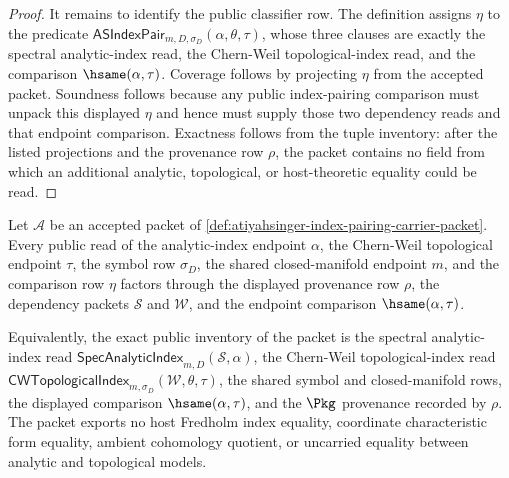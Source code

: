 \begin{proof}
It remains to identify the public classifier row. The definition assigns $\eta$ to the predicate $\mathsf{ASIndexPair}_{m,D,\sigma_D}(\alpha,\theta,\tau)$, whose three clauses are exactly the spectral analytic-index read, the Chern-Weil topological-index read, and the comparison $\hsame(\alpha,\tau)$. Coverage follows by projecting $\eta$ from the accepted packet. Soundness follows because any public index-pairing comparison must unpack this displayed $\eta$ and hence must supply those two dependency reads and that endpoint comparison. Exactness follows from the tuple inventory: after the listed projections and the provenance row $\rho$, the packet contains no field from which an additional analytic, topological, or host-theoretic equality could be read.
\end{proof}

\begin{theorem}
\label{thm:atiyahsinger-index-pairing-provenance-exactness}
Let $\mathcal{A}$ be an accepted packet of
\autoref{def:atiyahsinger-index-pairing-carrier-packet}. Every public read of
the analytic-index endpoint $\alpha$, the Chern-Weil topological endpoint
$\tau$, the symbol row $\sigma_D$, the shared closed-manifold endpoint $m$, and
the comparison row $\eta$ factors through the displayed provenance row $\rho$,
the dependency packets $\mathcal{S}$ and $\mathcal{W}$, and the endpoint
comparison $\hsame(\alpha,\tau)$.

Equivalently, the exact public inventory of the packet is the spectral
analytic-index read
$\mathsf{SpecAnalyticIndex}_{m,D}(\mathcal{S},\alpha)$, the Chern-Weil
topological-index read
$\mathsf{CWTopologicalIndex}_{m,\sigma_D}(\mathcal{W},\theta,\tau)$, the shared
symbol and closed-manifold rows, the displayed comparison $\hsame(\alpha,\tau)$,
and the $\Pkg$ provenance recorded by $\rho$. The packet exports no host
Fredholm index equality, coordinate characteristic form equality, ambient
cohomology quotient, or uncarried equality between analytic and topological
models.
\end{theorem}
